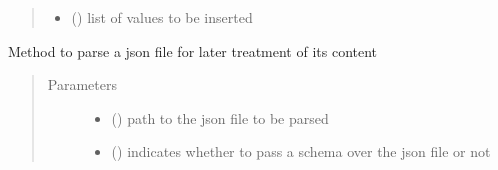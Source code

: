\begin{fulllineitems}
\begin{fulllineitems}
\begin{quote}
\begin{description}
\begin{itemize}
\item {} 
 () \textendash{} list of values to be inserted

\end{itemize}

\end{description}\end{quote}

\end{fulllineitems}


\begin{fulllineitems}
\label{\detokenize{eboa.engine:eboa.engine.engine.Engine.parse_data_from_json}}
Method to parse a json file for later treatment of its content
\begin{quote}\begin{description}
\item[{Parameters}] \leavevmode\begin{itemize}
\item {} 
 () \textendash{} path to the json file to be parsed

\item {} 
 () \textendash{} indicates whether to pass a schema over the json file or not

\end{itemize}

\end{description}\end{quote}

\end{fulllineitems}



\end{fulllineitems}
